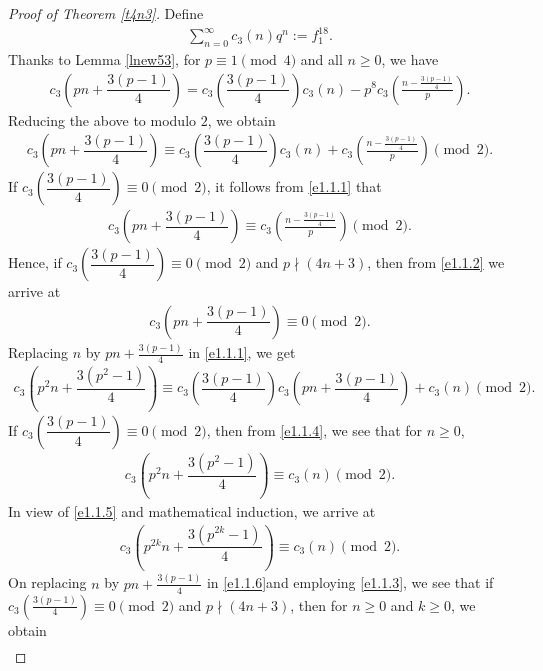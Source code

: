 \documentclass[11pt,a4paper]{article}
\numberwithin{equation}{section}
\theoremstyle{plain}
\begin{document}
\begin{proof}[Proof of Theorem \ref{t4n3}\unskip]
		Define
	\begin{align}
		\sum_{n=0}^{\infty}c_3(n)q^n:=f_1^{18}.\label{e1.1.0}
	\end{align}
	Thanks to Lemma \ref{lnew53}, for $p\equiv 1\pmod 4$ and all $n\ge 0$, we have
	\begin{align*}
		c_3\left(pn+\dfrac{3(p-1)}{4}\right)=c_3\left(\dfrac{3(p-1)}{4}\right)c_3(n)-p^8c_3\left(\frac{n-\frac{3(p-1)}{4}}{p}\right).
	\end{align*}
	Reducing the above to modulo $2$, we obtain
	\begin{align}
		c_3\left(pn+\dfrac{3(p-1)}{4}\right)\equiv c_3\left(\dfrac{3(p-1)}{4}\right)c_3(n)+c_3\left(\frac{n-\frac{3(p-1)}{4}}{p}\right)\pmod 2.\label{e1.1.1}
	\end{align}
	If $c_3\left(\dfrac{3(p-1)}{4}\right)\equiv 0\pmod 2$, it follows from \eqref{e1.1.1} that
	\begin{align}
		c_3\left(pn+\dfrac{3(p-1)}{4}\right)\equiv c_3\left(\frac{n-\frac{3(p-1)}{4}}{p}\right)\pmod 2.\label{e1.1.2}
	\end{align}
Hence, if $c_3\left(\dfrac{3(p-1)}{4}\right)\equiv 0\pmod 2$ and $p\nmid(4n+3)$, then from \eqref{e1.1.2} we arrive at
\begin{align}
	c_3\left(pn+\dfrac{3(p-1)}{4}\right)\equiv 0\pmod 2.	\label{e1.1.3}
	\end{align}
	Replacing $n$ by $pn+\frac{3(p-1)}{4}$ in \eqref{e1.1.1}, we get
	\begin{align}
		c_3\left(p^2n+\dfrac{3(p^2-1)}{4}\right)\equiv c_3\left(\dfrac{3(p-1)}{4}\right)c_3\left(pn+\dfrac{3(p-1)}{4}\right)+c_3(n)\pmod 2.\label{e1.1.4}
	\end{align}
	If $c_3\left(\dfrac{3(p-1)}{4}\right)\equiv 0\pmod 2$, then from \eqref{e1.1.4}, we see that for $n\ge 0$,
	\begin{align}
		c_3\left(p^2n+\dfrac{3(p^2-1)}{4}\right)\equiv c_3(n)\pmod 2.\label{e1.1.5}
	\end{align}
	In view of \eqref{e1.1.5} and mathematical induction, we arrive at
	\begin{align}
		c_3\left(p^{2k}n+\dfrac{3(p^{2k}-1)}{4}\right)\equiv c_3(n)\pmod 2.\label{e1.1.6}
	\end{align}
	On replacing $n$ by $pn+\frac{3(p-1)}{4}$ in \eqref{e1.1.6}and employing \eqref{e1.1.3}, we see that if $c_3\left(\frac{3(p-1)}{4}\right)\equiv 0\pmod 2$ and $p\nmid(4n+3)$, then for $n\ge 0$ and $k\ge 0$, we obtain
	\begin{align}

\end{align}
\end{proof}
\end{document}
